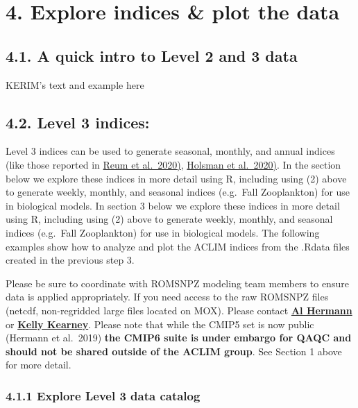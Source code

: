 \documentclass[
]{article}
\begin{document}
\hypertarget{explore-indices-plot-the-data}{%
\section{4. Explore indices \& plot the
data}\label{explore-indices-plot-the-data}}

\hypertarget{a-quick-intro-to-level-2-and-3-data}{%
\subsection{4.1. A quick intro to Level 2 and 3
data}\label{a-quick-intro-to-level-2-and-3-data}}

KERIM's text and example here

\hypertarget{level-3-indices}{%
\subsection{4.2. Level 3 indices:}\label{level-3-indices}}

Level 3 indices can be used to generate seasonal, monthly, and annual
indices (like those reported in
\href{https://www.frontiersin.org/articles/10.3389/fmars.2020.00124/full}{Reum
et al.~2020)},
\href{http://dx.doi.org/10.1038/s41467-020-18300-3}{Holsman et
al.~2020)}. In the section below we explore these indices in more detail
using R, including using (2) above to generate weekly, monthly, and
seasonal indices (e.g.~Fall Zooplankton) for use in biological models.
In section 3 below we explore these indices in more detail using R,
including using (2) above to generate weekly, monthly, and seasonal
indices (e.g.~Fall Zooplankton) for use in biological models. The
following examples show how to analyze and plot the ACLIM indices from
the .Rdata files created in the previous step 3.

Please be sure to coordinate with ROMSNPZ modeling team members to
ensure data is applied appropriately. If you need access to the raw
ROMSNPZ files (netcdf, non-regridded large files located on MOX). Please
contact \href{albert.j.hermann@noaa.gov}{\textbf{Al Hermann}} or
\href{kelly.kearney@noaa.gov}{\textbf{Kelly Kearney}}. Please note that
while the CMIP5 set is now public (Hermann et al.~2019) \textbf{the
CMIP6 suite is under embargo for QAQC and should not be shared outside
of the ACLIM group}. See Section 1 above for more detail.

\hypertarget{explore-level-3-data-catalog}{%
\subsubsection{4.1.1 Explore Level 3 data
catalog}\label{explore-level-3-data-catalog}}
\end{document}
